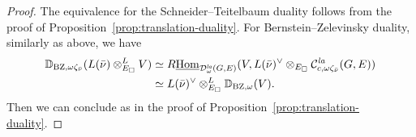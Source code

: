 \documentclass[a4paper,10pt]{amsart}
\theoremstyle{remark}
\theoremstyle{definition}
\theoremstyle{plain}
\numberwithin{equation}{section}
\newcommand{\bbD}{{\mathbb D}}
\newcommand{\calC}{{\mathcal C}}
\newcommand{\calD}{{\mathcal D}}
\newcommand{\Hom}{{\rm Hom}}
\newcommand{\uHom}{\underline{\Hom}}
\newcommand{\la}{{\it la}}
\newcommand{\BZ}{\ensuremath{\mathrm{BZ}}}
\begin{document}
\begin{proof}
The equivalence for the Schneider--Teitelbaum duality follows from the proof of Proposition~\ref{prop:translation-duality}. For Bernstein--Zelevinsky duality, similarly as above, we have
\begin{equation}\label{eq:fixed-BZ-algebraic-tensor}
\begin{aligned}
 \bbD_{\BZ,\omega\zeta_{\bar\nu}}
 (L(\bar\nu)\otimes^L_{E_\square}V)&\simeq
 R\uHom_{\calD^{\la}_\omega(G,E)}
 (V,L(\bar\nu)^\vee\otimes_{E_\square}
 \calC_{c,\omega\zeta_{\bar\nu}}^{\la}(G,E))\\
 &\simeq L(\bar\nu)^\vee\otimes^L_{E_\square}\bbD_{\BZ,\omega}(V).
\end{aligned}
\end{equation} 
Then we can conclude as in the proof of Proposition~\ref{prop:translation-duality}.
\end{proof}


\setcounter{tocdepth}{2}


\end{document}
